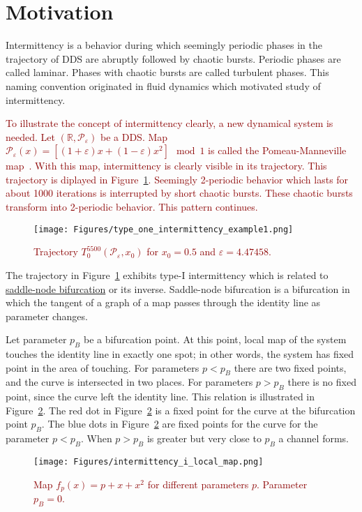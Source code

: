 \section{Motivation}
Intermittency is a behavior during which seemingly periodic phases in the trajectory of DDS are abruptly followed by chaotic bursts.
Periodic phases are called laminar.
Phases with chaotic bursts are called turbulent phases.
This naming convention originated in fluid dynamics which motivated study of intermittency.~\cite{Pomeau1980}
\par
\textcolor{darkred}{
To illustrate the concept of intermittency clearly, a new dynamical system is needed.
Let $(\mathbb{R}, \mathcal{P}_{\varepsilon})$ be a DDS.
Map $\mathcal{P}_{\varepsilon}(x) = \left[ (1+\varepsilon)x+(1-\varepsilon)x^2 \right] \mod{1}$ is called the Pomeau-Manneville map~\cite{Manneville1980,Datseris2022}.
With this map, intermittency is clearly visible in its trajectory.
This trajectory is diplayed in Figure~\ref{fig:intermittent_trajectory_example}.
Seemingly 2-periodic behavior which lasts for about 1000 iterations is interrupted by short chaotic bursts.
These chaotic bursts transform into 2-periodic behavior.
This pattern continues.
}

\begin{figure}[!h]
    \centering
    \texttt{[image: Figures/type\_one\_intermittency\_example1.png]}
    \caption{
        \textcolor{darkred}{
        Trajectory $T^{5500}_{0}(\mathcal{P}_{\varepsilon}, x_0)$ for $x_0 = 0.5$ and $\varepsilon = 4.47458$.
        }
    }
    \label{fig:intermittent_trajectory_example}
\end{figure}

The trajectory in Figure~\ref{fig:intermittent_trajectory_example} exhibits type-I intermittency which is related to \hyperref[def:saddle_node_bif]{saddle-node bifurcation} or its inverse.
Saddle-node bifurcation is a bifurcation in which the tangent of a graph of a map passes through the identity line as parameter changes.
\par
Let parameter $p_{B}$ be a bifurcation point.
At this point, local map of the system touches the identity line in exactly one spot; in other words, the system has fixed point in the area of touching.
For parameters $p < p_{B}$ there are two fixed points, and the curve is intersected in two places.
For parameters $p > p_{B}$ there is no fixed point, since the curve left the identity line.
This relation is illustrated in Figure~\ref{fig:saddle_node_bifurcation}.
The red dot in Figure~\ref{fig:saddle_node_bifurcation} is a fixed point for the curve at the bifurcation point $p_{B}$.
The blue dots in Figure~\ref{fig:saddle_node_bifurcation} are fixed points for the curve for the parameter $p < p_{B}$.
When $p > p_{B}$ is greater but very close to $p_{B}$ a channel forms.
\begin{figure}[!h]
    \centering
    \texttt{[image: Figures/intermittency\_i\_local\_map.png]}
    \caption{
        \textcolor{darkred}{
        Map $f_{p}(x) = p + x + x^2$ for different parameters $p$. 
        Parameter $p_B = 0$.
        }
    }
    \label{fig:saddle_node_bifurcation}
\end{figure}

